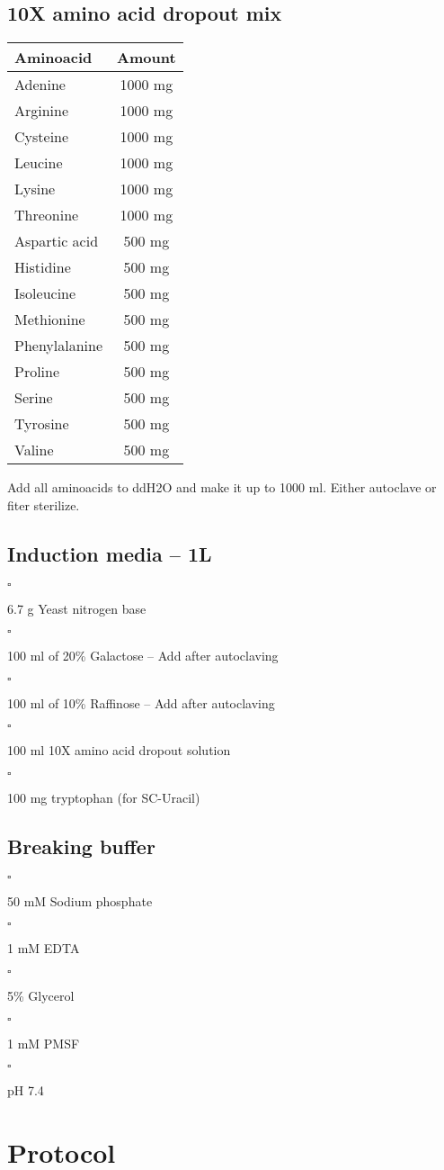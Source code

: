 \documentclass[a4paper,12pt]{article}
\newenvironment{packed_enum}{
\begin{enumerate}
  \setlength{\itemsep}{1pt}
  \setlength{\parskip}{0pt}
  \setlength{\parsep}{0pt}
}{\end{enumerate}}
\newcommand{\checkbox}{$\square$\hspace{1mm}}
\newcommand{\icb}{\item \checkbox}
\begin{document}
	\subsection{10X amino acid dropout mix}
	\begin{tabular}{l  c }
		{\bf Aminoacid} & {\bf Amount}\\
		\hline
		Adenine & 1000 mg \\
		Arginine & 1000 mg  \\
		Cysteine & 1000 mg \\
		Leucine & 1000 mg \\
		Lysine& 1000 mg \\
		Threonine & 1000 mg \\
		Aspartic acid & 500 mg \\
		Histidine & 500 mg \\
		Isoleucine & 500 mg \\
		Methionine & 500 mg \\
		Phenylalanine & 500 mg \\
		Proline & 500 mg \\
		Serine & 500 mg \\
		Tyrosine & 500 mg \\
		Valine & 500 mg \\
	\end{tabular}
	
		Add all aminoacids to ddH{\scriptsize2}O and make it up to 1000 ml. Either autoclave or fiter sterilize.
	\subsection{Induction media -- 1L}
	\begin{packed_enum}
	 	{\icb} 6.7 g Yeast nitrogen base
		{\icb} 100 ml of 20\% Galactose -- Add after autoclaving
		{\icb} 100 ml of 10\% Raffinose -- Add after autoclaving
		{\icb} 100 ml 10X amino acid dropout solution
		{\icb} 100 mg tryptophan (for SC-Uracil)
	\end{packed_enum}
	
	\subsection{Breaking buffer}
	\begin{packed_enum}
	{\icb} 50 mM Sodium phosphate
	{\icb} 1 mM EDTA
	{\icb} 5\% Glycerol
	{\icb} 1 mM PMSF
	{\icb} pH 7.4
	
	\end{packed_enum}
\section {Protocol}
\end{document}
